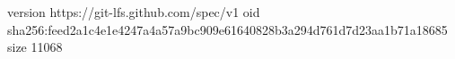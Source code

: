version https://git-lfs.github.com/spec/v1
oid sha256:feed2a1c4e1e4247a4a57a9bc909e61640828b3a294d761d7d23aa1b71a18685
size 11068
